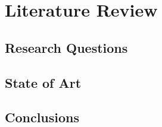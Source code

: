 % 
\chapter{Literature Review} %

%
\section{Research Questions} 

\section{State of Art}

\section{Conclusions}
